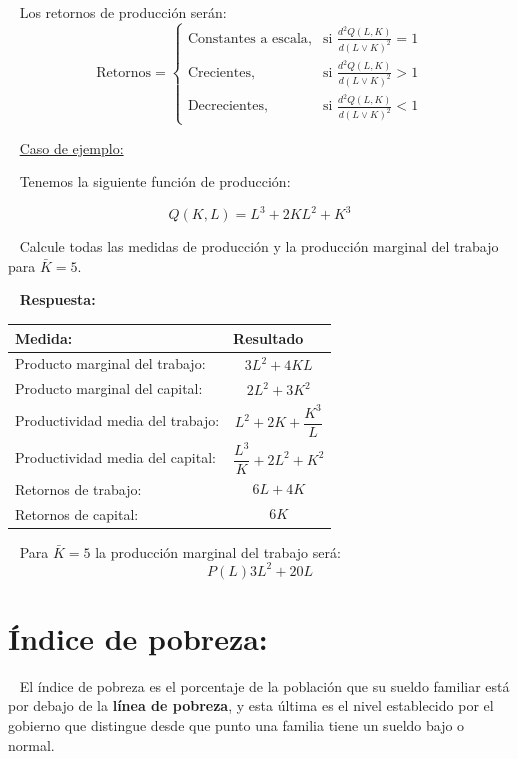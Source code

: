 \documentclass[
  letterpaper,
  DIV=11,
  numbers=noendperiod]{scrreport}
\begin{document}
~ Los retornos de producción serán: \[
\text{Retornos} =
\begin{cases}
  \text{Constantes a escala}, & \text{si } \frac{d^2Q(L,K)}{d(L\vee K)^2} = 1 \\
  \text{Crecientes}, & \text{si } \frac{d^2Q(L,K)}{d(L\vee K)^2} > 1 \\
  \text{Decrecientes}, & \text{si } \frac{d^2Q(L,K)}{d(L\vee K)^2} < 1
\end{cases}
\]

~ \ul{Caso de ejemplo:}

~ Tenemos la siguiente función de producción:

\[
Q(K,L)=L^3+2KL^2+K^3
\]

~ Calcule todas las medidas de producción y la producción marginal del
trabajo para \(\bar{K}=5\).

~ \textbf{Respuesta:}

\begin{table}[h]
    \centering
    \begin{tabular}{|p{40mm}|p{40mm}|}
        \hline
        Medida: & Resultado\\\hline
        Producto marginal del trabajo: & \[3L^2+4KL\] \\\hline
        Producto marginal del capital: & \[2L^2+3K^2\] \\\hline
        Productividad media del trabajo: & \[L^2+2K+\frac{K^3}{L}\] \\\hline
        Productividad media del capital: & \[\frac{L^3}{K}+2L^2+K^2\] \\\hline
        Retornos de trabajo: & \[6L+4K\]  \\\hline
        Retornos de capital: & \[6K\] \\\hline
    \end{tabular}
    
\end{table}

~ Para \(\bar{K}=5\) la producción marginal del trabajo será: \[
P(L)3L^2+20L
\]

\hypertarget{uxedndice-de-pobreza}{%
\section{Índice de pobreza:}\label{uxedndice-de-pobreza}}

~ El índice de pobreza es el porcentaje de la población que su sueldo
familiar está por debajo de la \textbf{línea de pobreza}, y esta última
es el nivel establecido por el gobierno que distingue desde que punto
una familia tiene un sueldo bajo o normal.
\end{document}
